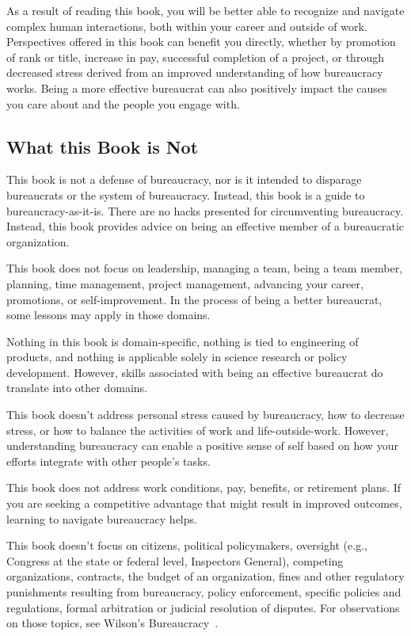 As a result of reading this book, you will be better able to recognize and navigate complex human interactions, both within your career and outside of work. Perspectives offered in this book can benefit you directly, whether by promotion of rank or title, increase in pay, successful completion of a project, or through decreased stress derived from an improved understanding of how bureaucracy works. Being a more effective bureaucrat can also positively impact the causes you care about and the people you engage with.





\subsection*{What this Book is Not}

This book is not a defense of bureaucracy, nor is it intended to disparage bureaucrats or the system of bureaucracy. Instead, this book is a guide to bureaucracy-as-it-is. There are no hacks presented for circumventing bureaucracy. Instead, this book provides advice on being an effective member of a bureaucratic organization.

This book does not focus on leadership, managing a team, being a team member, planning, time management, project management, advancing your career, promotions, or self-improvement. In the process of being a better bureaucrat, some lessons may apply in those domains.


Nothing in this book is domain-specific, nothing is tied to engineering of products, and nothing is applicable solely in science research or policy development. However, skills associated with being an effective bureaucrat do translate into other domains.

This book doesn't address personal stress caused by bureaucracy, how to decrease stress, or how to balance the activities of work and life-outside-work.   However, understanding bureaucracy can enable a positive sense of self based on how your efforts integrate with other people's tasks. 

This book does not address work conditions, pay, benefits, or retirement plans. If you are seeking a competitive advantage that might result in improved outcomes, learning to navigate bureaucracy helps.


This book doesn't focus on citizens, political policymakers, oversight (e.g., Congress at the state or federal level, Inspectors General), competing organizations, contracts, the budget of an organization, fines and other regulatory punishments resulting from bureaucracy, policy enforcement, specific policies and regulations, formal arbitration or judicial resolution of disputes. For observations on those topics, see Wilson's Bureaucracy~\cite{1991_Wilson}. 



